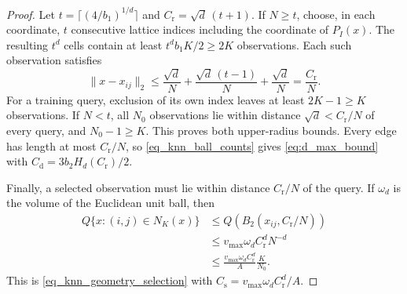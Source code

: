\documentclass[twoside,11pt]{article}
\newenvironment{revision}{\color{revisionred}}{}
\begin{document}
\begin{revision}
\begin{proof}
Let $t=\lceil(4/b_1)^{1/d}\rceil$ and
$C_{\mathrm r}=\sqrt d\,(t+1)$.
If $N\geq t$, choose, in each coordinate, $t$ consecutive lattice
indices including the coordinate of $P_I(x)$. The resulting
$t^d$ cells contain at least $t^d b_1 K/2\geq2K$ observations.
Each such observation satisfies
\[
\|x-x_{ij}\|_2
\leq\frac{\sqrt d}{N}
    +\frac{\sqrt d\,(t-1)}{N}+\frac{\sqrt d}{N}
=\frac{C_{\mathrm r}}{N}.
\]
For a training query, exclusion of its own index leaves at least
$2K-1\geq K$ observations. If $N<t$, all $N_0$ observations
lie within distance $\sqrt d<C_{\mathrm r}/N$ of every query,
and $N_0-1\geq K$. This proves both upper-radius bounds.
Every edge has length at most $C_{\mathrm r}/N$, so
\eqref{eq_knn_ball_counts} gives \eqref{eq:d_max_bound} with
$C_{\mathrm d}=3b_2H_d(C_{\mathrm r})/2$.

Finally, a selected observation must lie within distance
$C_{\mathrm r}/N$ of the query. If $\omega_d$ is the volume of
the Euclidean unit ball, then
\begin{align*}
Q\{x:(i,j)\in N_K(x)\}
&\leq Q(B_2(x_{ij},C_{\mathrm r}/N))\\
&\leq v_{\max}\omega_d C_{\mathrm r}^d N^{-d}\\
&\leq\frac{v_{\max}\omega_d C_{\mathrm r}^d}{A}
          \frac{K}{N_0}.
\end{align*}
This is \eqref{eq_knn_geometry_selection} with
$C_{\mathrm s}=v_{\max}\omega_d C_{\mathrm r}^d/A$.
\end{proof}
\end{revision}
\end{document}
